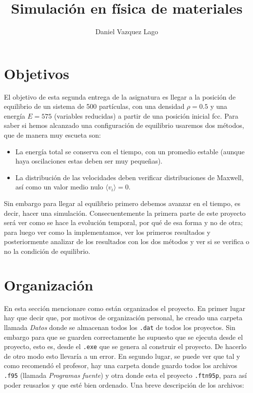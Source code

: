 \documentclass[11pt]{article} %
\author{Daniel Vazquez Lago}
\title{Simulación en física de materiales}
\begin{document}
	
	
\maketitle
\newpage
\tableofcontents
\section{Objetivos}

El objetivo de esta segunda entrega de la asignatura es llegar a la posición de equilibrio de un sistema de 500 partículas, con una densidad $\rho=0.5$ y una energía $E=575$ (variables reducidas) a partir de una posición inicial fcc. Para saber si hemos alcanzado una configuración de equilibrio usaremos dos métodos, que de manera muy escueta son: 

\begin{itemize}
	\item La energía total se conserva con el tiempo, con un promedio estable (aunque haya oscilaciones estas deben ser muy pequeñas).
	\item La distribución de las velocidades deben verificar distribuciones de Maxwell, así como un valor medio nulo $\langle v_i \rangle = 0$. 
\end{itemize}
Sin embargo para llegar al equilibrio primero debemos avanzar en el tiempo, es decir, hacer una simulación. Consecuentemente la primera parte de este proyecto será ver como se hace la evolución temporal, por qué de esa forma y no de otra; para luego ver como la implementamos, ver los primeros resultados y posteriormente analizar de los resultados con los dos métodos y ver si se verifica o no la condición de equilibrio. 

\section{Organización}

En esta sección mencionare como están organizados el proyecto. En primer lugar hay que decir que, por motivos de organización personal, he creado una carpeta llamada \textit{Datos} donde se almacenan todos los \texttt{.dat} de todos los proyectos. Sin embargo para que se guarden correctamente he supuesto que se ejecuta desde el proyecto, esto es, desde el \texttt{.exe} que se genera al construir el proyecto. De hacerlo de otro modo esto llevaría a un error. En segundo lugar, se puede ver que tal y como recomendó el profesor, hay una carpeta donde guardo todos los archivos \texttt{.f95} (llamada \textit{Programas fuente}) y otra donde esta el proyecto \texttt{.ftn95p}, para así poder reusarlos y que esté bien ordenado. Una breve descripción de los archivos:
\end{document}
